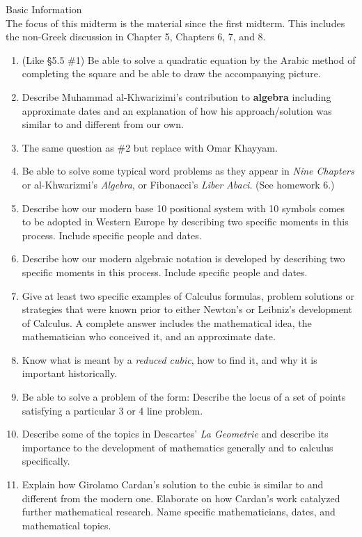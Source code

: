 \documentclass[12pt]{article}
\begin{document}
Basic Information\\
The focus of this midterm is the material since the first midterm. This includes the non-Greek discussion in Chapter 5, Chapters 6, 7, and 8. \\

\begin{enumerate}
\item (Like \S 5.5 \#1) Be able to solve a quadratic equation by the Arabic method of completing the square and be able to draw the accompanying picture.
\item Describe Muhammad al-Khwarizimi's contribution to \textbf{algebra} including approximate dates and an explanation of how his approach/solution was similar to and different from our own.
\item The same question as \#2 but replace with Omar Khayyam.
\item Be able to solve some typical word problems as they appear in \textit{Nine Chapters} or al-Khwarizmi's \textit{Algebra}, or Fibonacci's \textit{Liber Abaci}. (See homework 6.) 
\item Describe how our modern base 10 positional system with 10 symbols comes to be adopted in Western Europe by describing two specific moments in this process. Include specific people and dates.
\item Describe how our modern algebraic notation is developed by describing two specific moments in this process. Include specific people and dates.
\item Give at least two specific examples of Calculus formulas, problem solutions or strategies that were known prior to either Newton's or Leibniz's development of Calculus. A complete answer includes the mathematical idea, the mathematician who conceived it, and an approximate date.
\item Know what is meant by a \textit{reduced cubic}, how to find it, and why it is important historically.
\item Be able to solve a problem of the form: Describe the locus of a set of points satisfying a particular 3 or 4 line problem.
\item Describe some of the topics in Descartes' \textit{La Geometrie} and describe its importance to the development of mathematics generally and to calculus specifically.
\item Explain how Girolamo Cardan's solution to the cubic is similar to and different from the modern one. Elaborate on how Cardan's work catalyzed further mathematical research. Name specific mathematicians, dates, and mathematical topics.

\end{enumerate}
\end{document}
